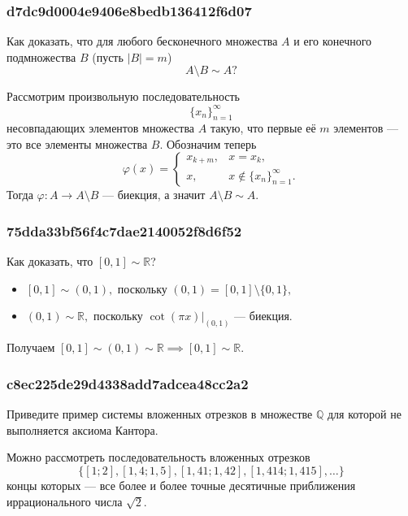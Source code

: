 \documentclass[11pt, a5paper]{article}
\newenvironment{note}[1]{\goodbreak\par\subsubsection{\hfill \color{lightgray}\tiny #1}}{}
\newenvironment{cloze}[2][\ldots]{\begin{leftbar}}{\end{leftbar}}
\begin{document}
    \begin{note}{d7dc9d0004e9406e8bedb136412f6d07}
        Как доказать, что для любого бесконечного множества \( A \) и его конечного
        подмножества \( B \) (пусть \( |B| = m \)) \[
            A \setminus B \sim  A?
        \]

        \begin{cloze}{1}
            Рассмотрим произвольную последовательность \[
                \{ x_n \}_{n = 1} ^{\infty }
            \] несовпадающих элементов множества \( A \) такую, что первые её \( m \)
            элементов --- это все элементы множества \( B. \) Обозначим теперь \[
                \varphi(x) = \begin{cases}
                    x_{k + m}, & x = x_k, \\
                    x, & x \not\in \{ x_n \}_{n = 1}^{\infty }.
                \end{cases}
            \] Тогда \( \varphi : A \to A \setminus B \) --- биекция, а значит
            \( A \setminus B \sim A. \)
        \end{cloze}
    \end{note}

    \begin{note}{75dda33bf56f4c7dae2140052f8d6f52}
        Как доказать, что \( [0, 1] \sim \mathbb R  \)?

        \begin{cloze}{1}
            \begin{itemize}
                \item \( [0, 1] \sim (0, 1),  \) поскольку \( (0, 1) = [0, 1]
                    \setminus \{ 0, 1 \},  \)
                \item \( (0, 1) \sim \mathbb R, \)  поскольку \( \cot (\pi
                    x)|_{(0, 1)} \) --- биекция.
            \end{itemize}
            Получаем \( [0, 1] \sim (0, 1) \sim \mathbb R \implies [0, 1] \sim
            \mathbb R. \)
        \end{cloze}
    \end{note}

    \begin{note}{c8ec225de29d4338add7adcea48cc2a2}
        Приведите пример системы вложенных отрезков в множестве \( \mathbb Q  \)
        для которой не выполняется аксиома Кантора.

        \begin{cloze}{1}
            Можно рассмотреть последовательность вложенных отрезков \[
                \{ [1;2], [1{,}4;1{,}5], [1{,}41;1{,}42],
                    [1{,}414;1{,}415],\ldots \}
            \] концы которых --- все более и более точные десятичные приближения
            иррационального числа \( \sqrt{2}. \)
        \end{cloze}
    \end{note}
\end{document}
